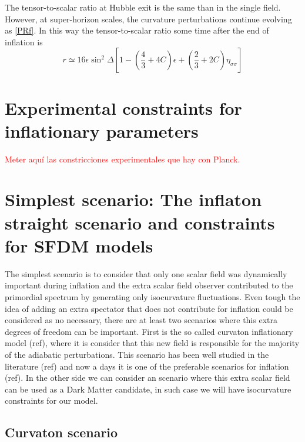 \documentclass[a4paper,fleqn,usenatbib,useAMS]{mnras}
\begin{document}
The tensor-to-scalar ratio at Hubble exit is the same than in the single field. However, at super-horizon scales, the curvature perturbations continue evolving as \eqref{PRf}. In this way the tensor-to-scalar ratio some time after the end of inflation is
\begin{equation}
r\simeq 16\epsilon \sin^2\Delta\left[1-\left(\frac{4}{3}+4C\right)\epsilon +\left(\frac{2}{3}+2C\right)\eta_{\sigma\sigma}\right]
\end{equation}
\section{Experimental constraints for inflationary parameters}

\textcolor{red}{Meter aqu\'i las constricciones experimentales que hay con Planck.}

%
%
%
%
%
%
\section{Simplest scenario: The inflaton straight scenario and constraints for SFDM models}

The simplest scenario is to consider that only one scalar field was dynamically important during inflation and the extra scalar field observer contributed to the primordial spectrum by generating only isocurvature fluctuations. Even tough the idea of adding an extra spectator that does not contribute for inflation could be considered as no necessary, there are at least two scenarios where this extra degrees of freedom can be important. First is the so called curvaton inflationary model (ref), where it is consider that this new field is responsible for the majority of the adiabatic perturbations. This scenario has been well studied in the literature (ref) and now a days it is one of the preferable scenarios for inflation (ref). In the other side we can consider an scenario where this extra scalar field can be used as a Dark Matter candidate, in such case we will have isocurvature constraints for our model. 

\subsection{Curvaton scenario}
\end{document}
